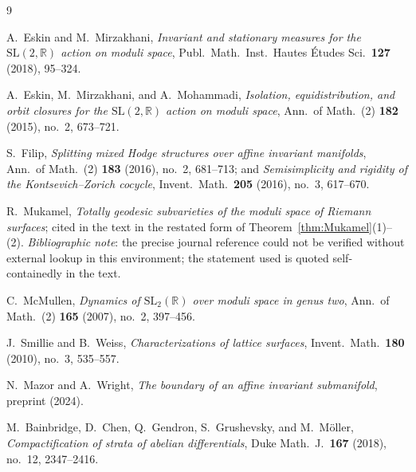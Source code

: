 \documentclass[11pt]{article}
\theoremstyle{definition}
\theoremstyle{remark}
\begin{document}
\begin{thebibliography}{9}

 A.~Eskin and M.~Mirzakhani,
\emph{Invariant and stationary measures for the
$\mathrm{SL}(2,\mathbb{R})$ action on moduli space},
Publ.\ Math.\ Inst.\ Hautes \'Etudes Sci.\ \textbf{127} (2018), 95--324.

 A.~Eskin, M.~Mirzakhani, and A.~Mohammadi,
\emph{Isolation, equidistribution, and orbit closures for the
$\mathrm{SL}(2,\mathbb{R})$ action on moduli space},
Ann.\ of Math.\ (2) \textbf{182} (2015), no.~2, 673--721.

 S.~Filip,
\emph{Splitting mixed Hodge structures over affine invariant manifolds},
Ann.\ of Math.\ (2) \textbf{183} (2016), no.~2, 681--713; and
\emph{Semisimplicity and rigidity of the Kontsevich--Zorich cocycle},
Invent.\ Math.\ \textbf{205} (2016), no.~3, 617--670.

 R.~Mukamel,
\emph{Totally geodesic subvarieties of the moduli space of Riemann
surfaces}; cited in the text in the restated form of
Theorem~\ref{thm:Mukamel}(1)--(2). \emph{Bibliographic note}: the
precise journal reference could not be verified without external lookup
in this environment; the statement used is quoted self-containedly in
the text.

 C.~McMullen,
\emph{Dynamics of $\mathrm{SL}_2(\mathbb{R})$ over moduli space in genus
two}, Ann.\ of Math.\ (2) \textbf{165} (2007), no.~2, 397--456.

 J.~Smillie and B.~Weiss,
\emph{Characterizations of lattice surfaces}, Invent.\ Math.\
\textbf{180} (2010), no.~3, 535--557.

 N.~Mazor and A.~Wright,
\emph{The boundary of an affine invariant submanifold},
preprint (2024).

 M.~Bainbridge, D.~Chen, Q.~Gendron, S.~Grushevsky, and
M.~M\"oller,
\emph{Compactification of strata of abelian differentials},
Duke Math.\ J.\ \textbf{167} (2018), no.~12, 2347--2416.

\end{thebibliography}
\end{document}
